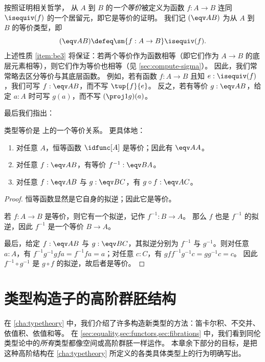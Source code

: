 按照证明相关哲学，
%
从 $A$ 到 $B$ 的\emph{一个等价}被定义为函数 $f:A\to B$ 连同 $\isequiv (f)$ 的一个居留元，即它是等价的证明。
我们记 $(\eqv A B)$ 为从 $A$ 到 $B$ 的等价类型，即
\begin{equation}\label{eq:eqv}
  (\eqv A B) \defeq \sm{f:A\to B} \isequiv(f).
\end{equation}
上述性质 \ref{item:be3} 将保证：若两个等价作为函数相等（即它们作为 $A\to B$ 的底层元素相等），则它们作为等价也相等（见 \cref{sec:compute-sigma}）。
因此，我们常常略去区分等价与其底层函数。
例如，若有函数 $f:A\to B$ 且知 $e:\isequiv(f)$，我们可写 $f:\eqv A B$，而不写 $\tup{f}{e}$。
反之，若有等价 $g:\eqv A B$，给定 $a:A$ 时可写 $g(a)$，而不写 $(\proj1 g)(a)$。

最后我们指出：

\begin{lem}\label{thm:equiv-eqrel}
  类型等价是 \type 上的一个等价关系。
  更具体地：
  \begin{enumerate}
  \item 对任意 $A$，恒等函数 $\idfunc[A]$ 是等价；因此有 $\eqv A A$。
  \item 对任意 $f:\eqv A B$，有等价 $f^{-1} : \eqv B A$。
  \item 对任意 $f:\eqv A B$ 与 $g:\eqv B C$，有 $g\circ f : \eqv A C$。
  \end{enumerate}
\end{lem}
\begin{proof}
  恒等函数显然是它自身的拟逆；因此它是等价。

  若 $f:A\to B$ 是等价，则它有一个拟逆，记作 $f^{-1}:B\to A$。
  那么 $f$ 也是 $f^{-1}$ 的拟逆，因此 $f^{-1}$ 是一个等价 $B\to A$。

  最后，给定 $f:\eqv A B$ 与 $g:\eqv B C$，其拟逆分别为 $f^{-1}$ 与 $g^{-1}$。则对任意 $a:A$，有 $f^{-1} g^{-1} g f a = f^{-1} f a = a$；对任意 $c:C$，有 $g f f^{-1} g^{-1} c = g g^{-1} c = c$。
  因此 $f^{-1} \circ g^{-1}$ 是 $g\circ f$ 的拟逆，故后者是等价。
\end{proof}

%
\section{类型构造子的高阶群胚结构}
\label{sec:computational}

在 \cref{cha:typetheory} 中，我们介绍了许多构造新类型的方法：笛卡尔积、不交并、依值积、依值和等。
在 \cref{sec:equality,sec:functors,sec:fibrations} 中，我们看到同伦类型论中的\emph{所有}类型都像空间或高阶群胚一样运作。
本章余下部分的目标，是把这种高阶结构在 \cref{cha:typetheory} 所定义的各类具体类型上的行为明确写出。

